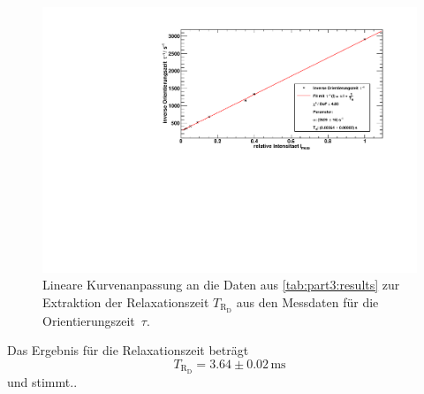 \begin{figure}[H]
\begin{center}
  \includegraphics[width=\textwidth]{../img/part5/taufit.pdf}
  \caption{Lineare Kurvenanpassung an die Daten aus \autoref{tab:part3:results} zur Extraktion
  der Relaxationszeit $T_{\text{R}_\text{D}}$ aus den Messdaten für die Orientierungszeit~$\tau$.}
  \label{img:deh:relaxtime}
\end{center}
\end{figure}

Das Ergebnis für die Relaxationszeit beträgt
\begin{equation}
  T_{\text{R}_\text{D}} = 3.64 \pm 0.02\,\text{ms}
\end{equation}
und stimmt..



